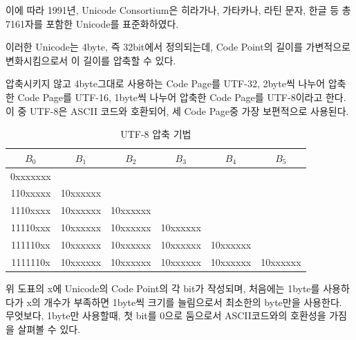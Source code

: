 \documentclass[a4paper,12pt]{book}
\begin{document}
\begin{appendices}
이에 따라 1991년, Unicode Consortium은 히라가나, 가타카나, 라틴 문자,
한글 등 총 7161자를 포함한 Unicode를 표준화하였다.

이러한 Unicode는 4byte, 즉 32bit에서 정의되는데,
Code Point의 길이를 가변적으로 변화시킴으로서 이 길이를 압축할 수 있다.

압축시키지 않고 4byte그대로 사용하는 Code Page를 UTF-32,
2byte씩 나누어 압축한 Code Page를 UTF-16,
1byte씩 나누어 압축한 Code Page를 UTF-8이라고 한다.
이 중 UTF-8은 ASCII 코드와 호환되어, 세 Code Page중 가장 보편적으로 사용된다.

\begingroup
    \centering
    \begin{longtable}{ || c | c | c | c | c | c || }
        \caption{UTF-8 압축 기법}

        \hline $B_0$ & $B_1$ & $B_2$ & $B_3$ & $B_4$ & $B_5$ \\
        \hline
        \hline 0xxxxxxx & & & & & \\
        \hline 110xxxxx & 10xxxxxx & & & & \\
        \hline 1110xxxx & 10xxxxxx & 10xxxxxx & & & \\
        \hline 11110xxx & 10xxxxxx & 10xxxxxx & 10xxxxxx & & \\
        \hline 111110xx & 10xxxxxx & 10xxxxxx & 10xxxxxx & 10xxxxxx & \\
        \hline 1111110x & 10xxxxxx & 10xxxxxx & 10xxxxxx & 10xxxxxx & 10xxxxxx \\
        \hline
    \end{longtable}
\endgroup

위 도표의 x에 Unicode의 Code Point의 각 bit가 작성되며,
처음에는 1byte를 사용하다가 x의 개수가 부족하면 1byte씩 크기를 늘림으로서 최소한의 byte만을 사용한다.
무엇보다, 1byte만 사용할때, 첫 bit를 0으로 둠으로서 ASCII코드와의 호환성을 가짐을 살펴볼 수 있다.




\end{appendices}
\end{document}
